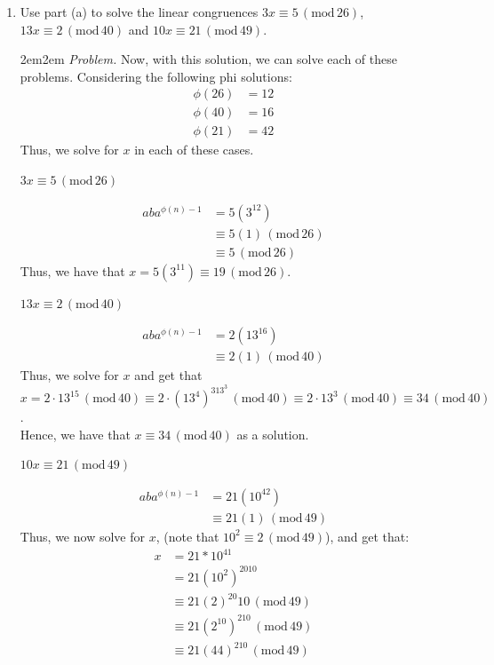 \documentclass[10pt,oneside]{book}
\newcommand{\gspc}{\vspace{0.13cm}} %
\newcommand{\gline}{\gspc\\} %
\newcommand{\gmod}[1]{\,(\text{mod}\,#1)}
\newcommand{\centerit}[1]{{\begin{center} #1 \end{center}}}
\newcommand{\ul}[1]{\underline{#1}}
\let\endoldproof\endproof
\newenvironment{problem}[1]
  {\vspace{-0.1cm}\begin{coloredadjust}\begin{adjustwidth}{2em}{2em}
   \textit{Problem. }#1}
  {\endoldproof
\end{adjustwidth}\end{coloredadjust}\gspc}
\begin{document}
\begin{enumerate}
\begin{enumerate}
\begin{problem}
			\begin{align*}
				ax&= a(ba^{\phi(n)-1})\\
				&= ba^{\phi(n)}\\
				&= b
			\end{align*}
			Thus, the solution $x = ba^{\phi(n)-1}$ holds. 
		\end{problem}
		\item Use part (a) to solve the linear congruences $3x\equiv 5\gmod{26}$, $13x\equiv 2 \gmod{40}$ and $10x\equiv 21\gmod{49}$. 
		\begin{problem}
			Now, with this solution, we can solve each of these problems. Considering the following phi solutions:
			\begin{align*}
				\phi(26)&= 12\\
				\phi(40)&= 16\\
				\phi(21)&= 42
			\end{align*}
			Thus, we solve for $x$ in each of these cases.
			\centerit{\ul{$3x\equiv 5\gmod{26}$}}
			\begin{align*}
				aba^{\phi(n)-1} &= 5(3^{12})\\
				&\equiv 5(1)\gmod{26}\\
				&\equiv 5\gmod{26}
			\end{align*}
			Thus, we have that $x = 5(3^{11})\equiv 19\gmod {26}$. 
			\centerit{\ul{$13x\equiv 2\gmod{40}$}}	
			\begin{align*}
				aba^{\phi(n)-1} &= 2(13^{16})\\
				&\equiv 2(1) \gmod{40}
			\end{align*}
			Thus, we solve for $x$ and get that $x = 2\cdot 13^{15}\gmod{40}\equiv 2\cdot (13^4)^313^3\gmod{40}\equiv 2\cdot 13^3 \gmod {40}\equiv 34\gmod{40}$. \gline
			Hence, we have that $x \equiv 34 \gmod{40}$ as a solution.
			\centerit{\ul{$10x\equiv 21\gmod{49}$}}	
			\begin{align*}
				aba^{\phi(n)-1} &= 21(10^{42})\\
				&\equiv 21(1) \gmod{49}
			\end{align*}
			Thus, we now solve for $x$, (note that $10^2 \equiv 2 \gmod {49}$), and get that:
			\begin{align*}
				x &= 21*10^{41}\\
				&= 21(10^2)^2010\\
				&\equiv 21(2)^{20}10\gmod{49}\\
				&\equiv 21(2^10)^210 \gmod {49}\\
				&\equiv 21 (44)^210\gmod{49}\\

\end{align*}
\end{problem}
\end{enumerate}
\end{enumerate}
\end{document}
